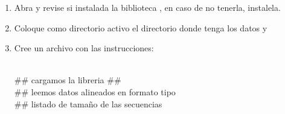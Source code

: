 \begin{enumerate}
	
	\item Abra  y revise si instalada la biblioteca , en caso de no tenerla, instalela.
	
	\item Coloque como directorio activo el directorio donde tenga los datos y 
	
	\item Cree un archivo con las instrucciones:

\\$\#\#$ cargamos la libreria 
$\#\#$
\\$\#\#$ leemos datos alineados en formato tipo 
\\$\#\#$ listado de tama\~no de las secuencias



\end{enumerate}
